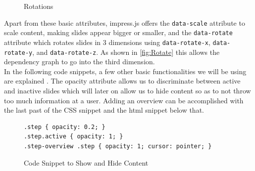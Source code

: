 \documentclass[twoside, 12pt]{article}
\begin{document}
\begin{figure}
\vspace{-26pt}
  \begin{center}
  \end{center}
\vspace{-20pt}
  \caption{Rotations \cite{Rotations:npentrel14}}
  \label{fig:Rotate}
\vspace{-10pt}
\end{figure}

Apart from these basic attributes, impress.js offers the \texttt{data-scale} attribute to scale content, making slides appear bigger or smaller, and the \texttt{data-rotate} attribute which rotates slides in 3 dimensions using \texttt{data-rotate-x}, \texttt{data-rotate-y}, and \texttt{data-rotate-z}. As shown in \autoref{fig:Rotate} this allows the dependency graph to go into the third dimension.\\

In the following code snippets, a few other basic functionalities we will be using are explained \cite{andismith:npentrel15}. The opacity attribute allows us to discriminate between active and inactive slides which will later on allow us to hide content so as to not throw too much information at a user. Adding an overview can be accomplished with the last past of the CSS snippet and the html snippet below that.\\

\begin{figure}
\vspace{-26pt}
\begin{verbatim}
.step { opacity: 0.2; }
.step.active { opacity: 1; }
.step-overview .step { opacity: 1; cursor: pointer; }
\end{verbatim}
\vspace{-5pt}
  \caption{Code Snippet to Show and Hide Content}
  \label{fig:SSlide}
  \vspace{30pt}
\end{figure}
\end{document}
